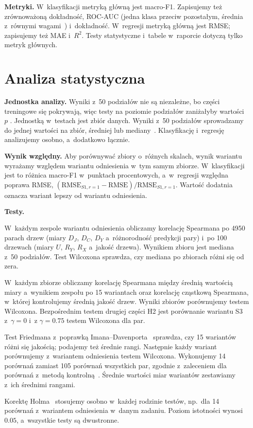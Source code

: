 \documentclass[11pt,a4paper]{article}
\begin{document}
\textbf{Metryki.} W~klasyfikacji metryką główną jest macro-F1. Zapisujemy też zrównoważoną dokładność, ROC-AUC (jedna klasa przeciw pozostałym, średnia z~równymi wagami~\cite{fawcett2006}) i~dokładność. W~regresji metryką główną jest RMSE; zapisujemy też MAE i~$R^2$. Testy statystyczne i~tabele w~raporcie dotyczą tylko metryk głównych.

\section{Analiza statystyczna}
\label{sec:stat}

\textbf{Jednostka analizy.} Wyniki z~50 podziałów nie są niezależne, bo części treningowe się pokrywają, więc testy na poziomie podziałów zaniżałyby wartości $p$ \cite{nadeau2003}. Jednostką w~testach jest zbiór danych. Wyniki z~50 podziałów sprowadzamy do jednej wartości na zbiór, średniej lub mediany~\cite{demsar2006}. Klasyfikację i~regresję analizujemy osobno, a~dodatkowo łącznie.

\textbf{Wynik względny.} Aby porównywać zbiory o~różnych skalach, wynik wariantu wyrażamy względem wariantu odniesienia w~tym samym zbiorze. W~klasyfikacji jest to różnica macro-F1 w~punktach procentowych, a~w~regresji względna poprawa RMSE, $(\mathrm{RMSE}_{S1,r=1}-\mathrm{RMSE})/\mathrm{RMSE}_{S1,r=1}$. Wartość dodatnia oznacza wariant lepszy od wariantu odniesienia.

\textbf{Testy.}
\begin{description}[leftmargin=1.2cm,style=sameline]
  \item[H1] W~każdym zespole wariantu odniesienia obliczamy korelację Spearmana po 4950 parach drzew (miary $D_J$, $D_C$, $D_Y$ a~różnorodność predykcji pary) i~po 100 drzewach (miary $U$, $R_Y$, $R_X$ a~jakość drzewa). Wynikiem zbioru jest mediana z~50 podziałów. Test Wilcoxona sprawdza, czy mediana po zbiorach różni się od zera.
  \item[H2] W~każdym zbiorze obliczamy korelację Spearmana między średnią wartością miary a~wynikiem zespołu po 15 wariantach oraz korelację cząstkową Spearmana, w~której kontrolujemy średnią jakość drzew. Wyniki zbiorów porównujemy testem Wilcoxona. Bezpośrednim testem drugiej części H2 jest porównanie wariantu S3 z~$\gamma=0$ i~z $\gamma=0.75$ testem Wilcoxona dla par.
  \item[H3] Test Friedmana z~poprawką Imana--Davenporta~\cite{demsar2006} sprawdza, czy 15 wariantów różni się jakością; podajemy też średnie rangi. Następnie każdy wariant porównujemy z~wariantem odniesienia testem Wilcoxona. Wykonujemy 14 porównań zamiast 105 porównań wszystkich par, zgodnie z~zaleceniem dla porównań z~metodą kontrolną~\cite{demsar2006}. Średnie wartości miar wariantów zestawiamy z~ich średnimi rangami.
\end{description}
Korektę Holma~\cite{holm1979} stosujemy osobno w~każdej rodzinie testów, np.\ dla 14 porównań z~wariantem odniesienia w~danym zadaniu. Poziom istotności wynosi $0.05$, a~wszystkie testy są dwustronne.
\end{document}
